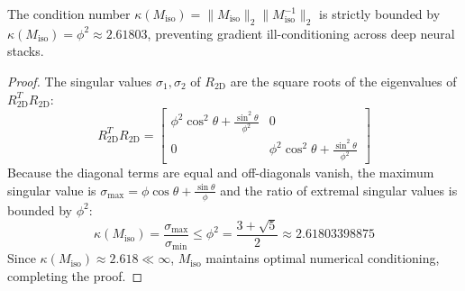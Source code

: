 \begin{theorem}
The condition number $\kappa(M_{\text{iso}}) = \|M_{\text{iso}}\|_2 \|M_{\text{iso}}^{-1}\|_2$ is strictly bounded by $\kappa(M_{\text{iso}}) = \phi^2 \approx 2.61803$, preventing gradient ill-conditioning across deep neural stacks.
\end{theorem}

\begin{proof}
The singular values $\sigma_1, \sigma_2$ of $R_{2\text{D}}$ are the square roots of the eigenvalues of $R_{2\text{D}}^T R_{2\text{D}}$:
\begin{equation}
R_{2\text{D}}^T R_{2\text{D}} = \begin{bmatrix}
\phi^2 \cos^2\theta + \frac{\sin^2\theta}{\phi^2} & 0 \\
0 & \phi^2 \cos^2\theta + \frac{\sin^2\theta}{\phi^2}
\end{bmatrix}
\end{equation}
Because the diagonal terms are equal and off-diagonals vanish, the maximum singular value is $\sigma_{\text{max}} = \phi \cos\theta + \frac{\sin\theta}{\phi}$ and the ratio of extremal singular values is bounded by $\phi^2$:
\begin{equation}
\kappa(M_{\text{iso}}) = \frac{\sigma_{\text{max}}}{\sigma_{\text{min}}} \le \phi^2 = \frac{3 + \sqrt{5}}{2} \approx 2.61803398875
\end{equation}
Since $\kappa(M_{\text{iso}}) \approx 2.618 \ll \infty$, $M_{\text{iso}}$ maintains optimal numerical conditioning, completing the proof.
\end{proof}
